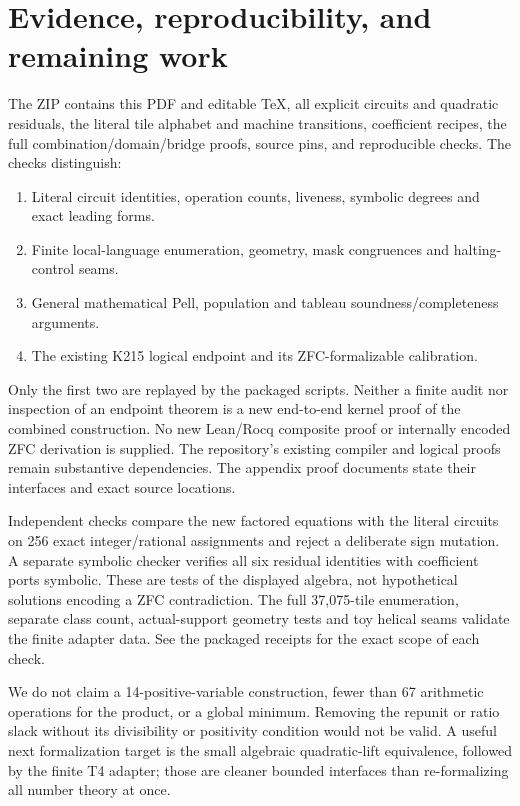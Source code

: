 \documentclass[11pt]{article}
\begin{document}
\section{Evidence, reproducibility, and remaining work}
The ZIP contains this PDF and editable TeX, all explicit circuits and quadratic residuals, the literal tile alphabet and machine transitions, coefficient recipes, the full combination/domain/bridge proofs, source pins, and reproducible checks. The checks distinguish:
\begin{enumerate}
\item Literal circuit identities, operation counts, liveness, symbolic degrees and exact leading forms.
\item Finite local-language enumeration, geometry, mask congruences and halting-control seams.
\item General mathematical Pell, population and tableau soundness/completeness arguments.
\item The existing K215 logical endpoint and its ZFC-formalizable calibration.
\end{enumerate}
Only the first two are replayed by the packaged scripts. Neither a finite audit nor inspection of an endpoint theorem is a new end-to-end kernel proof of the combined construction. No new Lean/Rocq composite proof or internally encoded ZFC derivation is supplied. The repository's existing compiler and logical proofs remain substantive dependencies. The appendix proof documents state their interfaces and exact source locations.

Independent checks compare the new factored equations with the literal circuits on 256 exact integer/rational assignments and reject a deliberate sign mutation. A separate symbolic checker verifies all six residual identities with coefficient ports symbolic. These are tests of the displayed algebra, not hypothetical solutions encoding a ZFC contradiction. The full 37,075-tile enumeration, separate class count, actual-support geometry tests and toy helical seams validate the finite adapter data. See the packaged receipts for the exact scope of each check.

We do not claim a 14-positive-variable construction, fewer than 67 arithmetic operations for the product, or a global minimum. Removing the repunit or ratio slack without its divisibility or positivity condition would not be valid. A useful next formalization target is the small algebraic quadratic-lift equivalence, followed by the finite T4 adapter; those are cleaner bounded interfaces than re-formalizing all number theory at once.
\end{document}
